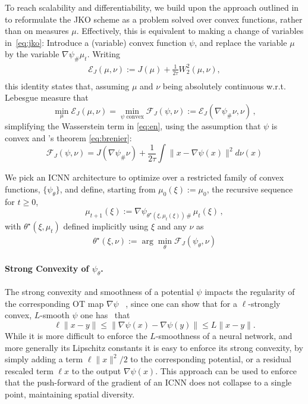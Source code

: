  To reach scalability and differentiability, we build upon the approach outlined in \citet{benamou2016discretization} to reformulate the \acrshort{JKO} scheme as a problem solved over convex functions, rather than on measures $\mu$. Effectively, this is equivalent to making a change of variables in~\eqref{eq:jko}: Introduce a (variable) convex function $\psi$, and replace the variable $\mu$ by the variable $\nabla \psi_{\#}\mu_t$. Writing
\begin{equation}\label{eq:en}
\begin{split}
\mathcal{E}_J(\mu, \nu) := J(\mu) +\frac{1}{2 \tau}W_2^2(\mu, \nu),\\
\end{split}
\end{equation}
this identity states that, assuming $\mu$ and $\nu$ being absolutely continuous w.r.t. Lebesgue measure that
$$\min_{\mu}\mathcal{E}_J(\mu,\nu) = \min_{\psi \text{ convex}} \mathcal{F}_J(\psi, \nu):= \mathcal{E}_J(\nabla \psi_{\#}\nu, \nu)\,,$$
simplifying the Wasserstein term in \eqref{eq:en}, using the assumption that $\psi$ is convex and \citeauthor{brenier1987decomposition}'s theorem \eqref{eq:brenier}:
\begin{equation}\mathcal{F}_J(\psi, \nu) = J(\nabla \psi_{\#}\nu) +\frac{1}{2 \tau} \!\! \int\!\! \| x - \nabla \psi(x) \|^2 d \nu(x)\label{eq:jko_psi}
\end{equation}

We pick an ICNN architecture to optimize over a restricted family of convex functions, $\{\psi_{\theta}\}$, and define, starting from $\mu_0(\xi):=\mu_0$, the recursive sequence for $t\geq 0$,
\begin{equation} \label{eq:next_pop}
\mu_{t+1}(\xi) := \nabla \psi_{\theta^\star\!(\xi, \mu_t(\xi))\, \#}\, \mu_{t}(\xi)\,,
\end{equation}
with $\theta^\star(\xi, \mu_t)$ defined implicitly using $\xi$ and any $\nu$ as 
\begin{align} \label{eq:thetastar}
    \theta^\star(\xi, \nu):=\arg \min_{\theta} \mathcal{F}_J(\psi_{\theta},\nu)
\end{align}

\vspace{-20pt} \paragraph{Strong Convexity of $\psi_\theta$.} The strong convexity and smoothness of a potential $\psi$ impacts the regularity of the corresponding OT map $\nabla\psi$ ~\citep{caffarelli2000monotonicity,figalli2010optimal}, since one can show that for a $\ell$-strongly convex, $L$-smooth $\psi$ one has~\citep{paty2020regularity} that
$$
\ell \|x - y\| \leq \|\nabla\psi(x) -\nabla\psi(y)\|  \leq L\|x - y\|.
$$
While it is more difficult to enforce the $L$-smoothness of a neural network, and more generally its Lipschitz constants \citep{scaman2018lipschitz} it is easy to enforce its strong convexity, by simply adding a term $\ell \|x\|^2/2$ to the corresponding potential, or a residual rescaled term $\ell x$ to the output $\nabla\psi(x)$. This approach can be used to enforce that the push-forward of the gradient of an ICNN does not collapse to a single point, maintaining spatial diversity.

